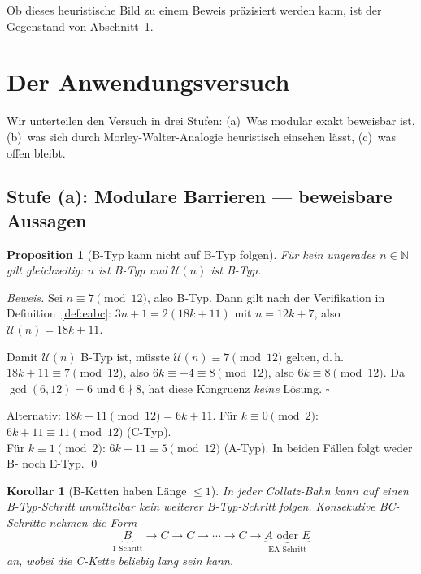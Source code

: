 \documentclass[12pt,a4paper]{article}
\newtheorem{proposition}[definition]{Proposition}
\newtheorem{korollar}[definition]{Korollar}
\newenvironment{beweis}{\begin{proof}[Beweis]}{\end{proof}}
\newcommand{\U}{\mathcal{U}}
\newcommand{\N}{\mathbb{N}}
\begin{document}
Ob dieses heuristische Bild zu einem Beweis präzisiert werden kann,
ist der Gegenstand von Abschnitt~\ref{sec:anwendung}.

\section{Der Anwendungsversuch}
\label{sec:anwendung}

Wir unterteilen den Versuch in drei Stufen:
(a)~Was modular exakt beweisbar ist,
(b)~was sich durch Morley-Walter-Analogie heuristisch einsehen lässt,
(c)~was offen bleibt.

\subsection{Stufe (a): Modulare Barrieren --- beweisbare Aussagen}

\begin{proposition}[B-Typ kann nicht auf B-Typ folgen]
\label{prop:kein-bb}
Für kein ungerades $n \in \N$ gilt gleichzeitig:
$n$ ist B-Typ und $\U(n)$ ist B-Typ.
\end{proposition}

\begin{beweis}
Sei $n \equiv 7 \pmod{12}$, also B-Typ. Dann gilt nach der Verifikation
in Definition~\ref{def:eabc}: $3n+1 = 2(18k+11)$ mit $n=12k+7$,
also $\U(n) = 18k+11$.

Damit $\U(n)$ B-Typ ist, müsste $\U(n) \equiv 7 \pmod{12}$ gelten, d.\,h.
$18k + 11 \equiv 7 \pmod{12}$, also $6k \equiv -4 \equiv 8 \pmod{12}$,
also $6k \equiv 8 \pmod{12}$. Da $\gcd(6,12) = 6$ und $6 \nmid 8$,
hat diese Kongruenz \emph{keine} Lösung. $\square$

Alternativ: $18k+11 \pmod{12} = 6k+11$.
Für $k \equiv 0 \pmod 2$: $6k+11 \equiv 11 \pmod{12}$ (C-Typ). \\
Für $k \equiv 1 \pmod 2$: $6k+11 \equiv 5 \pmod{12}$ (A-Typ).
In beiden Fällen folgt weder B- noch E-Typ. \qed
\end{beweis}

\begin{korollar}[B-Ketten haben Länge $\leq 1$]
\label{kor:b-ketten}
In jeder Collatz-Bahn kann auf einen B-Typ-Schritt unmittelbar
kein weiterer B-Typ-Schritt folgen. Konsekutive BC-Schritte
nehmen die Form
\[
  \underbrace{B}_{1\text{ Schritt}}
  \to C \to C \to \cdots \to C
  \to \underbrace{A \text{ oder } E}_{\text{EA-Schritt}}
\]
an, wobei die C-Kette beliebig lang sein kann.
\end{korollar}
\end{document}
